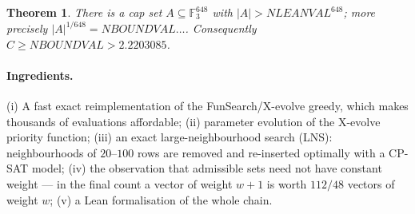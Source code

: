 \documentclass[11pt]{article}
\numberwithin{equation}{section}
\newtheorem{theorem}{Theorem}[section]
\theoremstyle{definition}
\theoremstyle{remark}
\newcommand{\F}{\mathbb F}
\newcommand{\NBOUND}{NBOUNDVAL}
\newcommand{\NLEAN}{NLEANVAL}
\begin{document}
\begin{theorem}\label{thm:main}
There is a cap set $A\subseteq \F_3^{648}$ with $|A|>\NLEAN^{648}$; more precisely
$|A|^{1/648}=\NBOUND\ldots$.  Consequently $C\ge\NBOUND>2.2203085$.
\end{theorem}

\paragraph{Ingredients.}  (i) A fast exact reimplementation of the FunSearch/X-evolve greedy, which
makes thousands of evaluations affordable; (ii) parameter evolution of the X-evolve priority function;
(iii) an exact large-neighbourhood search (LNS): neighbourhoods of $20$--$100$ rows are removed and
re-inserted optimally with a CP-SAT model; (iv) the observation that admissible sets need not have
constant weight --- in the final count a vector of weight $w+1$ is worth $112/48$ vectors of weight
$w$; (v) a Lean formalisation of the whole chain.
\end{document}
